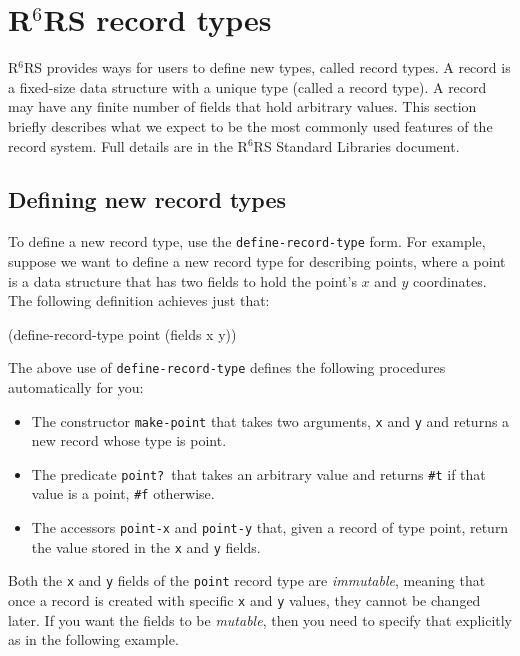 \documentclass[onecolumn, 12pt, twoside, openright, dvipdfm]{book}
\newcommand{\rnrs}[1]{R$^{\mathrm{#1}}$RS}
\begin{document}
\section{\rnrs{6} record types}

\rnrs{6} provides ways for users to define new types, called record
types.  A record is a fixed-size data structure with a unique type
(called a record type).  A record may have any finite number of
fields that hold arbitrary values.  This section briefly describes
what we expect to be the most commonly used features of the record
system.  Full details are in the \rnrs{6} Standard Libraries
document\cite{r6rs:lib}.

\subsection{Defining new record types}

To define a new record type,  use the \texttt{define-record-type}
form.  For example, suppose we want to define a new record type for
describing points, where a point is a data structure that has two
fields to hold the point's $x$ and $y$ coordinates.  The following
definition achieves just that:

\begin{CodeInline}
(define-record-type point
  (fields x y))
\end{CodeInline}

The above use of \texttt{define-record-type} defines the following
procedures automatically for you:
\begin{itemize}
\item The constructor \texttt{make-point} that takes two arguments,
\texttt{x} and \texttt{y} and returns a new record whose type is
point.
\item The predicate \texttt{point?}\ that takes an arbitrary value
and returns \texttt{\#t} if that value is a point, \texttt{\#f}
otherwise. 
\item The accessors \texttt{point-x} and \texttt{point-y} that,
given a record of type point, return the value stored in the
\texttt{x} and \texttt{y} fields.
\end{itemize}

Both the \texttt{x} and \texttt{y} fields of the \texttt{point}
record type are \emph{immutable}, meaning that once a record is
created with specific \texttt{x} and \texttt{y} values, they cannot
be changed later.  If you want the fields to be \emph{mutable}, then
you need to specify that explicitly as in the following example.
\newpage
\end{document}
